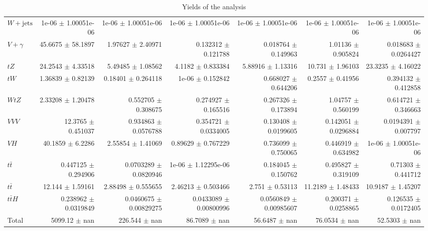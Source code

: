 \begin{table}[H]
\begin{center}
\begin{tabular}{|l|n{5}{2}|n{5}{2}|n{5}{2}|n{5}{2}|n{5}{2}|n{5}{2}|}
  $W+\text{jets}$   & 1e-06 $\pm$ 1.00051e-06 & 1e-06 $\pm$ 1.00051e-06 & 1e-06 $\pm$ 1.00051e-06 & 1e-06 $\pm$ 1.00051e-06 & 1e-06 $\pm$ 1.00051e-06 & 1e-06 $\pm$ 1.00051e-06 \\ 
  $V+\gamma$   & 45.6675 $\pm$ 58.1897 & 1.97627 $\pm$ 2.40971 & 0.132312 $\pm$ 0.121788 & 0.018764 $\pm$ 0.149963 & 1.01136 $\pm$ 0.905824 & 0.018683 $\pm$ 0.0264427 \\ 
  $tZ$   & 24.2543 $\pm$ 4.33518 & 5.49485 $\pm$ 1.08562 & 4.1182 $\pm$ 0.833384 & 5.88916 $\pm$ 1.13316 & 10.731 $\pm$ 1.96103 & 23.3235 $\pm$ 4.16022 \\ 
  $tW$   & 1.36839 $\pm$ 0.82139 & 0.18401 $\pm$ 0.264118 & 1e-06 $\pm$ 0.152842 & 0.668027 $\pm$ 0.644206 & 0.2557 $\pm$ 0.41956 & 0.394132 $\pm$ 0.412858 \\ 
  $WtZ$   & 2.33208 $\pm$ 1.20478 & 0.552705 $\pm$ 0.308675 & 0.274927 $\pm$ 0.165516 & 0.267326 $\pm$ 0.173894 & 1.04757 $\pm$ 0.560199 & 0.614721 $\pm$ 0.346663 \\ 
  $VVV$   & 12.3765 $\pm$ 0.451037 & 0.934863 $\pm$ 0.0576788 & 0.354721 $\pm$ 0.0334005 & 0.130408 $\pm$ 0.0199605 & 0.142051 $\pm$ 0.0296884 & 0.0194391 $\pm$ 0.007797 \\ 
  $VH$   & 40.1859 $\pm$ 6.2286 & 2.55854 $\pm$ 1.41069 & 0.89629 $\pm$ 0.767229 & 0.736099 $\pm$ 0.750065 & 0.446919 $\pm$ 0.634982 & 1e-06 $\pm$ 1.00051e-06 \\ 
  $t\bar{t}$   & 0.447125 $\pm$ 0.294906 & 0.0703289 $\pm$ 0.0820946 & 1e-06 $\pm$ 1.12295e-06 & 0.184045 $\pm$ 0.150762 & 0.495827 $\pm$ 0.319109 & 0.71303 $\pm$ 0.441712 \\ 
  $t\bar{t}$   & 12.144 $\pm$ 1.59161 & 2.88498 $\pm$ 0.555655 & 2.46213 $\pm$ 0.503466 & 2.751 $\pm$ 0.53113 & 11.2189 $\pm$ 1.48433 & 10.9187 $\pm$ 1.45207 \\ 
  $t\bar{t}H$   & 0.238962 $\pm$ 0.0319849 & 0.0460675 $\pm$ 0.00829275 & 0.0433089 $\pm$ 0.00800996 & 0.0560849 $\pm$ 0.00985607 & 0.200371 $\pm$ 0.0258865 & 0.126535 $\pm$ 0.0172405 \\ 
\hline 
  Total  & 5099.12 $\pm$ nan & 226.544 $\pm$ nan & 86.7089 $\pm$ nan & 56.6487 $\pm$ nan & 76.0534 $\pm$ nan & 52.5303 $\pm$ nan \\ 
\hline 
\end{tabular} 
\caption{Yields of the analysis} 
\end{center} 
\end{table} 

